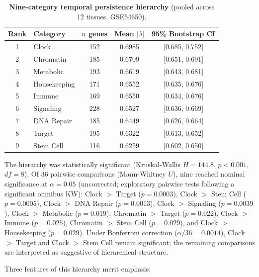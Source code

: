 \documentclass[11pt,letterpaper]{article}
\begin{document}
\begin{table}[H]
\centering
\caption{\textbf{Nine-category temporal persistence hierarchy} (pooled across 12 tissues, GSE54650).}
\label{tab:ninecategory}
\begin{tabular}{clccc}
\toprule
\textbf{Rank} & \textbf{Category} & \textbf{$n$ genes} & \textbf{Mean $|\lambda|$} & \textbf{95\% Bootstrap CI} \\
\midrule
1 & Clock            & 152 & 0.6985 & [0.685, 0.752] \\
2 & Chromatin        & 185 & 0.6709 & [0.651, 0.691] \\
3 & Metabolic        & 193 & 0.6619 & [0.643, 0.681] \\
4 & Housekeeping     & 171 & 0.6552 & [0.635, 0.676] \\
5 & Immune           & 169 & 0.6550 & [0.634, 0.676] \\
6 & Signaling        & 228 & 0.6527 & [0.636, 0.669] \\
7 & DNA Repair       & 185 & 0.6449 & [0.626, 0.664] \\
8 & Target           & 195 & 0.6322 & [0.613, 0.652] \\
9 & Stem Cell        & 116 & 0.6259 & [0.602, 0.650] \\
\bottomrule
\end{tabular}
\end{table}

The hierarchy was statistically significant (Kruskal-Wallis $H = 144.8$, $p < 0.001$, $df = 8$). Of 36 pairwise comparisons (Mann-Whitney $U$), nine reached nominal significance at $\alpha = 0.05$ (uncorrected; exploratory pairwise tests following a significant omnibus KW): Clock $>$ Target ($p = 0.0003$), Clock $>$ Stem Cell ($p = 0.0005$), Clock $>$ DNA Repair ($p = 0.0013$), Clock $>$ Signaling ($p = 0.0039$), Clock $>$ Metabolic ($p = 0.019$), Chromatin $>$ Target ($p = 0.022$), Clock $>$ Immune ($p = 0.025$), Chromatin $>$ Stem Cell ($p = 0.029$), and Clock $>$ Housekeeping ($p = 0.029$). Under Bonferroni correction ($\alpha/36 = 0.0014$), Clock $>$ Target and Clock $>$ Stem Cell remain significant; the remaining comparisons are interpreted as suggestive of hierarchical structure.

Three features of this hierarchy merit emphasis:
\end{document}
